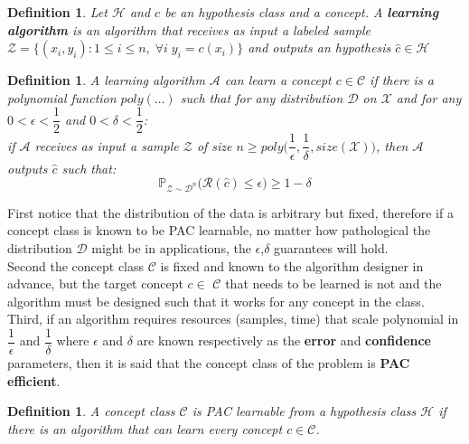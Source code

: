 \documentclass[twoside]{article}
\newtheorem{definition}[theorem]{Definition}
\begin{document}
\begin{definition}
Let $\mathbf{\mathcal{H}}$ and $c$ be an hypothesis class and a concept. A \textbf{learning algorithm} is an algorithm that receives as input a labeled sample $\mathbf{\mathcal{Z}} = \{(x_{i}
, y_{i}) : 1 \leq i \leq n, \;  \forall i \; y_{i} = c(x_{i}) \} $ and outputs an hypothesis $\hat{c} \in \mathbf{\mathcal{H}}$
\end{definition}

\begin{definition}
A learning algorithm $\mathbf{\mathcal{A}}$ can learn a concept $c \in \mathbf{\mathcal{C}}$ if there is a polynomial function $poly(\ldots)$ such that for any distribution $\mathbf{\mathcal{D}}$ on $\mathbf{\mathcal{X}}$ and for any $0 < \epsilon <\dfrac{1}{2}$ and $0 < \delta <\dfrac{1}{2}$: \\
if $\mathbf{\mathcal{A}}$ receives as input a sample $\mathbf{\mathcal{Z}}$ of size $n \geq poly\Big(\dfrac{1}{\epsilon},\dfrac{1}{\delta},size(\mathcal{X})\Big)$, then $\mathbf{\mathcal{A}}$ outputs $\hat{c}$ such that:
$$\mathbf{\mathbb{P}}_{\mathcal{Z} \sim \mathcal{D}^n}\Big(\mathcal{R}(\hat{c}) \leq \epsilon \Big) \geq 1- \delta$$
\end{definition}

First notice that the distribution of the data is arbitrary but fixed, therefore if a concept class is
known to be PAC learnable, no matter how pathological the distribution $\mathbf{\mathcal{D}}$ might
be in applications, the $\epsilon$,$ \delta$ guarantees will hold. \\
Second the concept class $\mathbf{\mathcal{C}}$ is fixed
and known to the algorithm designer in advance, but the target concept $c \in $ $\mathbf{\mathcal{C}}$ that
needs to be learned is not and the algorithm must be designed such that it works for
any concept in the class.\\
Third, if an algorithm requires resources (samples, time)
that scale polynomial in $\dfrac{1}{\epsilon}$ 
and $\dfrac{1}{\delta}$ where $\epsilon$ and $\delta$ are known respectively as the \textbf{error}
and \textbf{confidence} parameters, then it is said that the concept class of the problem is
\textbf{PAC efficient}.

\begin{definition}
A concept class $\mathbf{\mathcal{C}}$ is PAC learnable from a hypothesis class $\mathbf{\mathcal{H}}$ if there is an algorithm that can learn every concept $ c \in \mathbf{\mathcal{C}}$.
\end{definition}
\end{document}
